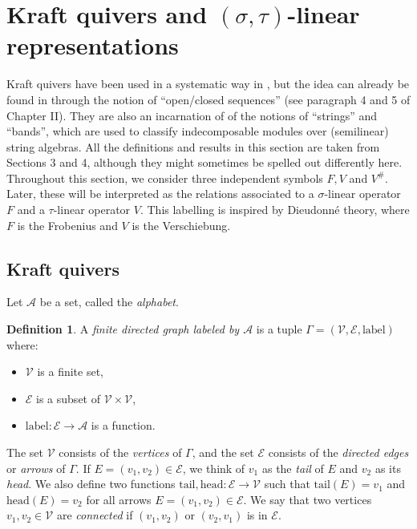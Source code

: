 \documentclass[12pt]{amsart}
\theoremstyle{definition}
\newtheorem{definition}[theorem]{Definition}
\newcommand{\<}{\langle}   %
\renewcommand{\>}{\rangle} %
\begin{document}
\section{Kraft quivers and $(\sigma,\tau)$-linear representations} \label{Section2}

Kraft quivers have been used in a systematic way in \cite{kraft:1975}, but the idea can already be found in \cite{gelfand-ponomarev:1968} through the notion of ``open/closed sequences'' (see paragraph 4 and 5 of Chapter II). They are also an incarnation of of the notions of ``strings'' and ``bands'', which are used to classify indecomposable modules over (semilinear) string algebras. All the definitions and results in this section are taken from \cite{chai:kraft2025} Sections 3 and 4, although they might sometimes be spelled out differently here. Throughout this section, we consider three independent symbols $F, V$ and $V^{\#}$. Later, these will be interpreted as the relations associated to a $\sigma$-linear operator $F$ and a $\tau$-linear operator $V$. This labelling is inspired by Dieudonné theory, where $F$ is the Frobenius and $V$ is the Verschiebung.

\subsection{Kraft quivers}

Let $\mathcal A$ be a set, called the \textit{alphabet}. 

\begin{definition}
A \textit{finite directed graph labeled by $\mathcal A$} is a tuple $\Gamma = (\mathcal V, \mathcal E, \mathrm{label})$ where:
\begin{itemize}
    \item $\mathcal V$ is a finite set,
    \item $\mathcal E$ is a subset of $\mathcal V \times \mathcal V$,
    \item $\mathrm{label}:\mathcal E \to \mathcal A$ is a function.
\end{itemize}
The set $\mathcal V$ consists of the \textit{vertices} of $\Gamma$, and the set $\mathcal E$ consists of the \textit{directed edges} or \textit{arrows} of $\Gamma$. If $E = (v_1,v_2) \in \mathcal E$, we think of $v_1$ as the \textit{tail} of $E$ and $v_2$ as its \textit{head}. We also define two functions $\mathrm{tail}, \mathrm{head}: \mathcal E \to \mathcal V$ such that $\mathrm{tail}(E) = v_1$ and $\mathrm{head}(E) = v_2$ for all arrows $E = (v_1,v_2) \in \mathcal E$. We say that two vertices $v_1,v_2 \in \mathcal V$ are \textit{connected} if $(v_1,v_2)$ or $(v_2,v_1)$ is in $\mathcal E$.
\end{definition} 
\end{document}
